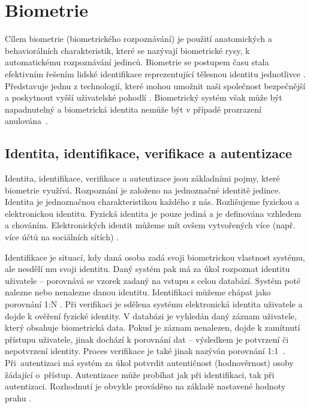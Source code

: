 \section{Biometrie}
Cílem biometrie (biometrického rozpoznávání) je použití anatomických a behaviorálních charakteristik, které se nazývají biometrické rysy, k automatickému rozpoznávání jedinců. Biometrie se postupem času stala efektivním řešením lidské identifikace reprezentující tělesnou identitu jednotlivce \cite{Maltoni2009}. Představuje jednu z technologií, které mohou umožnit naši společnost bezpečnější a poskytnout vyšší uživatelské pohodlí \cite{Maltoni2009}. Biometrický systém však může být napadnutelný a biometrická identita nemůže být v případě prozrazení anulována~\cite{BIOopora}.
\subsection{Identita, identifikace, verifikace a autentizace}
Identita, identifikace, verifikace a autentizace jsou základními pojmy, které biometrie využívá. Rozpoznání je založeno na jednoznačné identitě jedince. Identita je jednoznačnou charakteristikou každého z nás. Rozlišujeme fyzickou a elektronickou identitu. Fyzická identita je pouze jediná a je definována vzhledem a chováním. Elektronických identit můžeme mít ovšem vytvořených více (např. více účtů na sociálních sítích) \cite{BIOopora}.

Identifikace je situací, kdy daná osoba zadá svoji biometrickou vlastnost systému, ale nesdělí mu svoji identitu. Daný systém pak má za úkol rozpoznat identitu uživatele -- porovnává se vzorek zadaný na vstupu s celou databází. Systém poté nalezne nebo nenalezne danou identitu. Identifikaci můžeme chápat jako porovnání 1:N \cite{BIOopora}. Při verifikaci je sdělena systému elektronická identita uživatele a dojde k ověření fyzické identity. V databázi je vyhledán daný záznam uživatele, který obsahuje biometrická data. Pokud je záznam nenalezen, dojde k zamítnutí přístupu uživatele, jinak dochází k porovnání dat -- výsledkem je potvrzení či nepotvrzení identity. Proces verifikace je také jinak nazýván porovnání 1:1~\cite{BIOopora}. Při~autentizaci má systém za úkol potvrdit autentičnost (hodnověrnost) osoby žádající o~přístup. Autentizace může probíhat jak při identifikaci, tak při autentizaci. Rozhodnutí je obvykle prováděno na základě nastavené hodnoty prahu \cite{BIOopora}.
